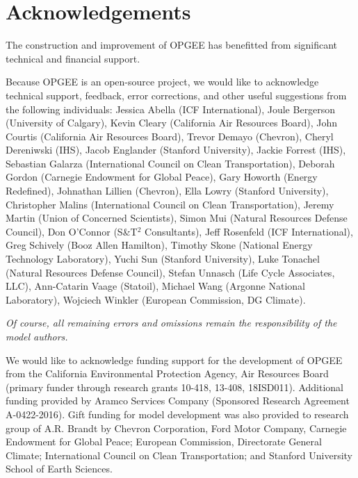 \documentclass[11pt]{report}
\begin{document}
\clearpage

\tableofcontents

\clearpage 

\listoffigures

\clearpage

\listoftables

\clearpage




\chapter{Acknowledgements}

The construction and improvement of OPGEE has benefitted from significant technical and financial support.  

\vspace{0.2in}
Because OPGEE is an open-source project, we would like to acknowledge technical support, feedback, error corrections, and other useful suggestions from the following individuals: Jessica Abella (ICF International), Joule Bergerson (University of Calgary), Kevin Cleary (California Air Resources Board), John Courtis (California Air Resources Board), Trevor Demayo (Chevron), Cheryl Dereniwski (IHS), Jacob Englander (Stanford University), Jackie Forrest (IHS), Sebastian Galarza (International Council on Clean Transportation), Deborah Gordon (Carnegie Endowment for Global Peace), Gary Howorth (Energy Redefined), Johnathan Lillien (Chevron), Ella Lowry (Stanford University), Christopher Malins (International Council on Clean Transportation), Jeremy Martin (Union of Concerned Scientists), Simon Mui (Natural Resources Defense Council), Don O'Connor (S\&T$^2$ Consultants), Jeff Rosenfeld (ICF International), Greg Schively (Booz Allen Hamilton), Timothy Skone (National Energy Technology Laboratory), Yuchi Sun (Stanford University), Luke Tonachel (Natural Resources Defense Council), Stefan Unnasch (Life Cycle Associates, LLC), Ann-Catarin Vaage (Statoil), Michael Wang (Argonne National Laboratory), Wojciech Winkler (European Commission, DG Climate). 

\vspace{0.2in}
\emph{Of course, all remaining errors and omissions remain the responsibility of the model authors.}

\vspace{0.2in}
We would like to acknowledge funding support for the development of OPGEE from the California Environmental Protection Agency, Air Resources Board (primary funder through research grants 10-418, 13-408, 18ISD011). Additional funding provided by Aramco Services Company (Sponsored Research Agreement  A-0422-2016). Gift funding for model development was also provided to research group of A.R. Brandt by Chevron Corporation, Ford Motor Company, Carnegie Endowment for Global Peace; European Commission, Directorate General Climate; International Council on Clean Transportation; and Stanford University School of Earth Sciences.
\end{document}
